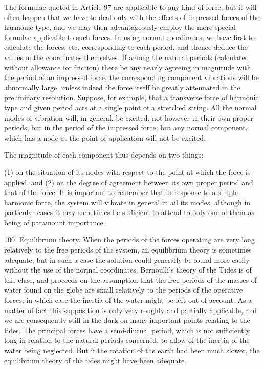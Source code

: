 The formulae quoted in Article 97 are applicable to any kind of force, but
it will often happen that we have to deal only with the effects of impressed
forces of the harmonic type, and we may then advantageously employ the more
special formulae applicable to such forces. In using normal coordinates, we
have first to calculate the forces, etc. corresponding to each period, and
thence deduce the values of the coordinates themselves. If among the natural
periods (calculated without allowance for friction) there be any nearly
agreeing in magnitude with the period of an impressed force, the corresponding
component vibrations will be abnormally large, unless indeed the force itself
be greatly attenuated in the preliminary resolution. Suppose, for example, that
a transverse force of harmonic type and given period acts at a single point of
a stretched string. All the normal modes of vibration will, in general, be
excited, not however in their own proper periods, but in the period of the
impressed force; but any normal component, which has a node at the point of
application will not be excited.

The magnitude of each component thus depends on two things:

(1) on the situation of its nodes with respect to the point at which the force
is applied, and (2) on the degree of agreement between its own proper period
and that of the force. It is important to remember that in response to a simple
harmonic force, the system will vibrate in general in ail its modes, although
in particular cases it may sometimes be sufficient to attend to only one of
them as being of paramount importance.

100. Equilibrium theory.
When the periods of the forces operating are very long relatively to the
free periods of the system, an equilibrium theory is sometimes adequate, but in
such a case the solution could generally be found more easily without the use
of the normal coordinates. Bernoulli's theory of the Tides is of this class,
and proceeds on the assumption that the free periods of the masses of water
found on the globe are small relatively to the periods of the operative forces,
in which case the inertia of the water might be left out of account. As a
matter of fact this supposition is only very roughly and partially applicable,
and we are consequently still in the dark on many important points relating to
the tides. The principal forces have a semi-diurnal period, which is not
sufficiently long in relation to the natural periods concerned, to allow of the
inertia of the water being neglected. But if the rotation of the earth had been
much slower, the equilibrium theory of the tides might have been adequate.

